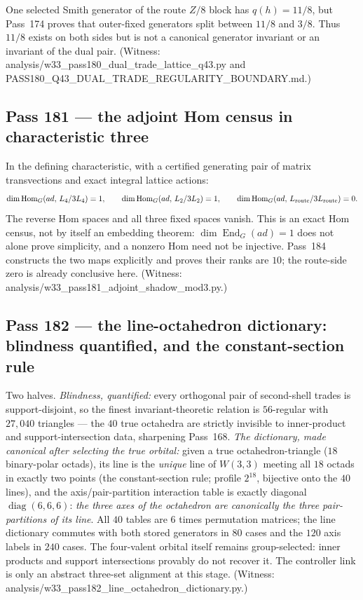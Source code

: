 \documentclass[12pt,a4paper]{article}
\def\mathbb#1{#1}%
\def\mathrm#1{#1}%
\def\texttt#1{#1}%
\theoremstyle{definition}
\begin{document}
One selected Smith generator of the route $\mathbb Z/8$ block has
$q(h)=11/8$, but Pass~174 proves that outer-fixed generators split between
$11/8$ and $3/8$.  Thus $11/8$ exists on both sides but is not a canonical
generator invariant or an invariant of the dual pair. (Witness:
\texttt{analysis/w33\_pass180\_dual\_trade\_lattice\_q43.py} and
\texttt{PASS180\_Q43\_DUAL\_TRADE\_REGULARITY\_BOUNDARY.md}.)

\subsection{Pass 181 --- the adjoint Hom census in characteristic three}
\label{ssec:pass181}

In the defining characteristic, with a certified generating pair of
matrix transvections and exact integral lattice actions:
\[
  \dim\operatorname{Hom}_G(\mathrm{ad},\,L_4/3L_4)=1,
  \qquad
  \dim\operatorname{Hom}_G(\mathrm{ad},\,L_2/3L_2)=1,
  \qquad
  \dim\operatorname{Hom}_G(\mathrm{ad},\,L_{\rm route}/3L_{\rm route})=0 .
\]
The reverse Hom spaces and all three fixed spaces vanish.  This is an
exact Hom census, not by itself an embedding theorem:
$\dim\operatorname{End}_G(\mathrm{ad})=1$ does not alone prove simplicity,
and a nonzero Hom need not be injective.  Pass~184 constructs the two
maps explicitly and proves their ranks are $10$; the route-side zero is
already conclusive here. (Witness:
\texttt{analysis/w33\_pass181\_adjoint\_shadow\_mod3.py}.)

\subsection{Pass 182 --- the line-octahedron dictionary: blindness
quantified, and the constant-section rule}
\label{ssec:pass182}

Two halves. \emph{Blindness, quantified:} every orthogonal pair of
second-shell trades is support-disjoint, so the finest
invariant-theoretic relation is $56$-regular with $27{,}040$ triangles
--- the $40$ true octahedra are strictly invisible to inner-product and
support-intersection data, sharpening Pass~168. \emph{The dictionary,
made canonical after selecting the true orbital:} given a true
octahedron-triangle ($18$ binary-polar
octads), its line is the \emph{unique} line of $W(3,3)$ meeting all $18$
octads in exactly two points (the constant-section rule; profile
$2^{18}$, bijective onto the $40$ lines), and the axis/pair-partition
interaction table is exactly diagonal
$\operatorname{diag}(6,6,6)$: \emph{the three axes of the octahedron are
canonically the three pair-partitions of its line}.  All $40$ tables are
$6$ times permutation matrices; the line dictionary commutes with both
stored generators in $80$ cases and the $120$ axis labels in $240$ cases.
The four-valent orbital itself remains group-selected: inner products and
support intersections provably do not recover it.  The controller link is
only an abstract three-set alignment at this stage. (Witness:
\texttt{analysis/w33\_pass182\_line\_octahedron\_dictionary.py}.)
\end{document}
